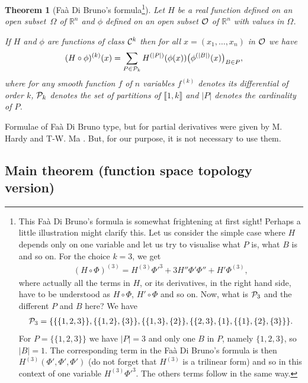 \documentclass[pdftex]{sigma}%
\numberwithin{equation}{section}
\newtheorem{Theorem}{Theorem}[section]
\begin{document}
\begin{Theorem}[Fa\`a Di Bruno's formula\footnote{This Fa\`a Di Bruno's formula is somewhat frightening at first sight! Perhaps a little illustration might clarify this. Let us consider the simple case where $H$ depends only on one variable and let us try to visualise what $P$ is, what $B$ is and so on. For the choice $k=3$, we get
\begin{gather*}
(H\circ\Phi)^{(3)}=H^{(3)}\Phi'^3+3H''\Phi'\Phi''+H'\Phi^{(3)},
\end{gather*}
			where actually all the terms in $H$, or its derivatives, in the right hand side, have to be understood as $H\circ\Phi$, $H'\circ\Phi$ and so on. Now, what is ${\cal P}_3$ and the different $P$ and $B$ here? We have
\begin{gather*}
{\cal P}_3=\{\{\{1,2,3\}\},\{\{1,2\},\{3\}\},\{\{1,3\},\{2\}\}, \{\{2,3\},\{1\},\{\{1\},\{2\},\{3\}\}\}.
\end{gather*}
			For $P=\{\{1,2,3\}\}$ we have $\vert P\vert=3$ and only one $B$ in $P$, namely $\{1,2,3\}$, so $\vert B\vert=1$. The corresponding term in the Fa\`a Di Bruno's formula is then $H^{(3)}(\Phi',\Phi',\Phi')$ (do not forget that $H^{(3)}$ is a trilinear form) and so in this context of one variable $H^{(3)}\Phi'^3$. The others terms follow in the same way.}]
	
	Let $H$ be a real function defined on an open subset~$\Omega$ of $\mathbb{R}^n$ and $\phi$ defined on an open subset $\cal O$ of $\mathbb{R}^n$ with values in $\Omega$.
	
	If $H$ and $\phi$ are functions of class ${\cal C}^k$ then for all $x=(x_1,\dots,x_n)$ in $\cal O$ we have
\begin{gather*}
(H\circ\phi)^{(k)}(x)=\sum_{P\in{\cal P}_k } H^{(\vert P\vert)}(\phi(x))\big(\phi^{(\vert B\vert)}(x)\big)_{B\in P},
\end{gather*}
	where for any smooth function $f$ of $n$ variables $f^{(k)}$ denotes its differential of order $k$, ${\cal P}_k$ denotes the set of partitions of $\llbracket 1,k\rrbracket $ and $\vert P\vert$ denotes the cardinality of $P$.
\end{Theorem}

Formulae of Fa\`a Di Bruno type, but for partial derivatives were given by M. Hardy \cite{Har} and T-W. Ma \cite{Ma}. But, for our purpose, it is not necessary to use them.

\subsection{Main theorem (function space topology version)}
\end{document}
